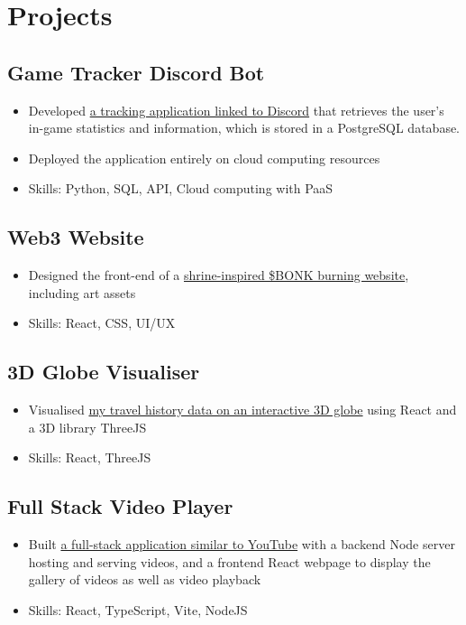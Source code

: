 \documentclass{cv}
\begin{document}
\section{Projects}
\begin{subsections}
    \item\subsection{Game Tracker Discord Bot}
    \begin{itemize}
        \item Developed \href{https://thedylone.github.io/laffey-bot/}{a tracking application linked to Discord} that retrieves the user's in-game statistics and information, which is stored in a PostgreSQL database.
        \item Deployed the application entirely on cloud computing resources
        \item Skills: Python, SQL, API, Cloud computing with PaaS
    \end{itemize}

    \item\subsection{Web3 Website}
    \begin{itemize}
        \item Designed the front-end of a \href{https://bonk-shrine.vercel.app/}{shrine-inspired \$BONK burning website}, including art assets
        \item Skills: React, CSS, UI/UX
    \end{itemize}

    \item\subsection{3D Globe Visualiser}
    \begin{itemize}
        \item Visualised \href{https://thedylone.github.io/travel-history/}{my travel history data on an interactive 3D globe} using React and a 3D library ThreeJS
        \item Skills: React, ThreeJS
    \end{itemize}

    \item\subsection{Full Stack Video Player}
    \begin{itemize}
        \item Built \href{https://github.com/thedylone/node-video-player}{a full-stack application similar to YouTube} with a backend Node server hosting and serving videos, and a frontend React webpage to display the gallery of videos as well as video playback 
        \item Skills: React, TypeScript, Vite, NodeJS
    \end{itemize}


\end{subsections}
\end{document}
